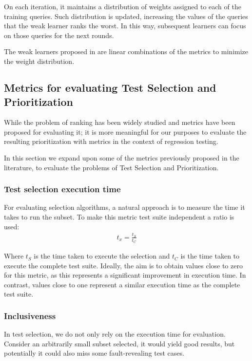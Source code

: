 On each iteration, it maintains a distribution of weights assigned to each of the training queries.
Such distribution is updated, increasing the values of the queries that the weak learner ranks the worst.
In this way, subsequent learners can focus on those queries for the next rounds.

The weak learners proposed in \cite{xuliadarank} are linear combinations of the metrics to minimize the weight distribution.

\subsection{Metrics for evaluating Test Selection and Prioritization}
\label{sec:bg-metrics-tsp}

While the problem of ranking has been widely studied and metrics have been proposed for evaluating it; it is more
meaningful for our purposes to evaluate the resulting prioritization with metrics in the context of regression testing.

In this section we expand upon some of the metrics previously proposed in the literature, to evaluate the problems of Test Selection
and Prioritization.

\subsubsection{Test selection execution time}
For evaluating selection algorithms, a natural approach is to measure the time it takes to run the subset. To make 
this metric test suite independent a ratio is used:
\begin{align*}
    t_x = \frac{t_S}{t_C}
\end{align*}

Where $t_S$ is the time taken to execute the selection and $t_C$ is the time taken to execute the complete test suite.
Ideally, the aim is to obtain values close to zero for this metric, as this represents a significant improvement
in execution time. In contrast, values close to one represent a similar execution time as the complete test suite.

\subsubsection{Inclusiveness}
In test selection, we do not only rely on the execution time for evaluation. Consider an arbitrarily small subset selected, it would yield good results,
but potentially it could also miss some fault-revealing test cases.

